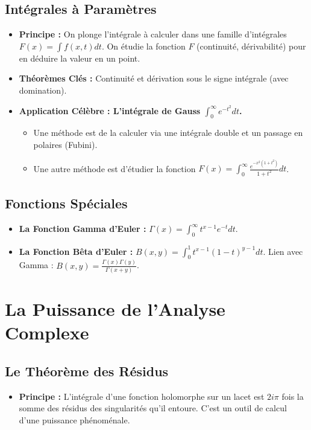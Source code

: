\documentclass[12pt, a4paper, parskip=full]{report}
\theoremstyle{agregstyle}
\begin{document}
\subsection{Intégrales à Paramètres}
\begin{itemize}
    \item \textbf{Principe :} On plonge l'intégrale à calculer dans une famille d'intégrales $F(x) = \int f(x,t)dt$. On étudie la fonction $F$ (continuité, dérivabilité) pour en déduire la valeur en un point.
    \item \textbf{Théorèmes Clés :} Continuité et dérivation sous le signe intégrale (avec domination).
    \item \textbf{Application Célèbre : L'intégrale de Gauss $\int_0^\infty e^{-t^2} dt$.}
        \begin{itemize}
            \item Une méthode est de la calculer via une intégrale double et un passage en polaires (Fubini).
            \item Une autre méthode est d'étudier la fonction $F(x) = \int_0^\infty \frac{e^{-x^2(1+t^2)}}{1+t^2}dt$.
        \end{itemize}
\end{itemize}
\subsection{Fonctions Spéciales}
\begin{itemize}
    \item \textbf{La Fonction Gamma d'Euler :} $\Gamma(x) = \int_0^\infty t^{x-1}e^{-t}dt$.
    \item \textbf{La Fonction Bêta d'Euler :} $B(x,y) = \int_0^1 t^{x-1}(1-t)^{y-1}dt$. Lien avec Gamma : $B(x,y)=\frac{\Gamma(x)\Gamma(y)}{\Gamma(x+y)}$.
\end{itemize}

\section{La Puissance de l'Analyse Complexe}
\subsection{Le Théorème des Résidus}
\begin{itemize}
    \item \textbf{Principe :} L'intégrale d'une fonction holomorphe sur un lacet est $2i\pi$ fois la somme des résidus des singularités qu'il entoure. C'est un outil de calcul d'une puissance phénoménale.
\end{itemize}
\end{document}
